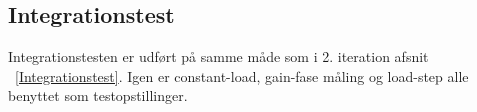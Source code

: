 \subsection{Integrationstest}
Integrationstesten er udført på samme måde som i 2. iteration afsnit ~\ref{Integrationstest}. Igen er constant-load, gain-fase måling og load-step alle benyttet som testopstillinger. 